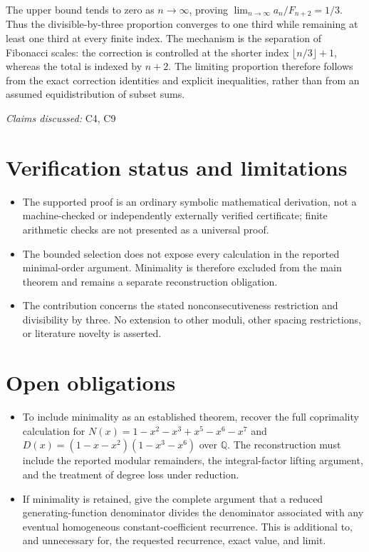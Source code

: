 \documentclass[11pt]{article}
\begin{document}
The upper bound tends to zero as $n\to\infty$, proving $\lim_{n\to\infty}a_n/F_{n+2}=1/3$. Thus the divisible-by-three proportion converges to one third while remaining at least one third at every finite index. The mechanism is the separation of Fibonacci scales: the correction is controlled at the shorter index $\lfloor n/3\rfloor+1$, whereas the total is indexed by $n+2$. The limiting proportion therefore follows from the exact correction identities and explicit inequalities, rather than from an assumed equidistribution of subset sums.

\textit{Claims discussed: }C4, C9
\section{Verification status and limitations}
\begin{itemize}
\item The supported proof is an ordinary symbolic mathematical derivation, not a machine-checked or independently externally verified certificate; finite arithmetic checks are not presented as a universal proof.
\item The bounded selection does not expose every calculation in the reported minimal-order argument. Minimality is therefore excluded from the main theorem and remains a separate reconstruction obligation.
\item The contribution concerns the stated nonconsecutiveness restriction and divisibility by three. No extension to other moduli, other spacing restrictions, or literature novelty is asserted.
\end{itemize}
\section{Open obligations}
\begin{itemize}
\item To include minimality as an established theorem, recover the full coprimality calculation for $N(x)=1-x^2-x^3+x^5-x^6-x^7$ and $D(x)=(1-x-x^2)(1-x^3-x^6)$ over $\mathbb{Q}$. The reconstruction must include the reported modular remainders, the integral-factor lifting argument, and the treatment of degree loss under reduction.
\item If minimality is retained, give the complete argument that a reduced generating-function denominator divides the denominator associated with any eventual homogeneous constant-coefficient recurrence. This is additional to, and unnecessary for, the requested recurrence, exact value, and limit.
\end{itemize}
\end{document}
